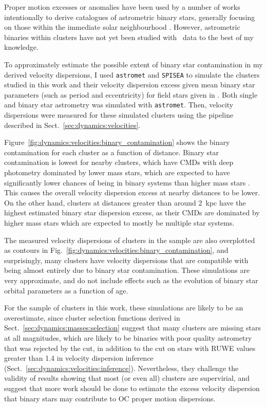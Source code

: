 Proper motion excesses or anomalies have been used by a number of works intentionally to derive catalogues of astrometric binary stars, generally focusing on those within the immediate solar neighbourhood \citep{kervella_stellar_substellar_2019,penoyre_astrometric_2022-1}. However, astrometric binaries within clusters have not yet been studied with \gaia\ data to the best of my knowledge.

To approximately estimate the possible extent of binary star contamination in my derived velocity dispersions, I used \texttt{astromet} \citep{penoyre_astrometric_2022,penoyre_astrometric_2022-1} and \texttt{SPISEA} \citep{hosek_jr_pypopstar_2020} to simulate the clusters studied in this work and their velocity dispersion excess given mean binary star parameters (such as period and eccentricity) for field stars given in \cite{moe_mind_2017}. Both single and binary star astrometry was simulated with \texttt{astromet}. Then, velocity dispersions were measured for these simulated clusters using the pipeline described in Sect.~\ref{sec:dynamics:velocities}.

Figure~\ref{fig:dynamics:velocities:binary_contamination} shows the binary contamination for each cluster as a function of distance. Binary star contamination is lowest for nearby clusters, which have CMDs with deep photometry dominated by lower mass stars, which are expected to have significantly lower chances of being in binary systems than higher mass stars \citep{moe_mind_2017}. This causes the overall velocity dispersion excess at nearby distances to be lower. On the other hand, clusters at distances greater than around 2~kpc have the highest estimated binary star dispersion excess, as their CMDs are dominated by higher mass stars which are expected to mostly be multiple star systems. 

The measured velocity dispersions of clusters in the sample are also overplotted as contours in Fig.~\ref{fig:dynamics:velocities:binary_contamination}, and surprisingly, many clusters have velocity dispersions that are compatible with being almost entirely due to binary star contamination. These simulations are very approximate, and do not include effects such as the evolution of binary star orbital parameters as a function of age.

For the sample of clusters in this work, these simulations are likely to be an overestimate, since cluster selection functions derived in Sect.~\ref{sec:dynamics:masses:selection} suggest that many clusters are missing stars at all magnitudes, which are likely to be binaries with poor quality astrometry that was rejected by the \cite{rybizki_classifier_2022} cut, in addition to the cut on stars with RUWE values greater than 1.4 in velocity dispersion inference (Sect.~\ref{sec:dynamics:velocities:inference}). Nevertheless, they challenge the validity of results showing that most (or even all) clusters are supervirial, and suggest that more work should be done to estimate the excess velocity dispersion that binary stars may contribute to OC proper motion dispersions. 


